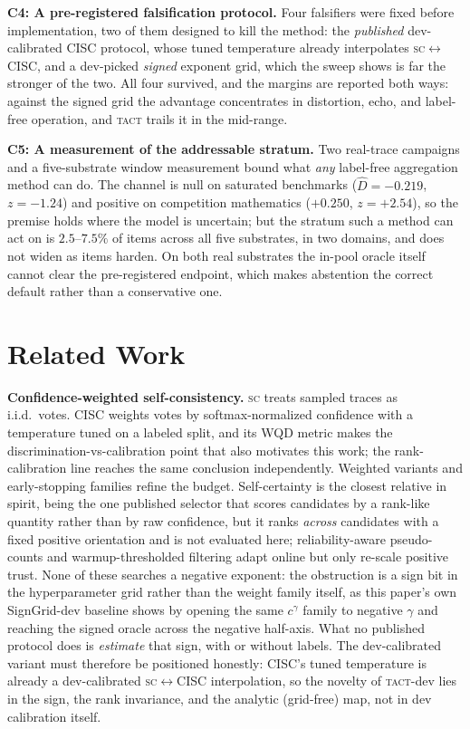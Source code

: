 \documentclass[twoside,11pt]{article}
\newcommand{\Dhat}{\widehat{D}}
\newcommand{\SC}{\textsc{sc}}
\newcommand{\TACT}{\textsc{tact}}
\begin{document}
\textbf{C4: A pre-registered falsification protocol.} Four falsifiers were
fixed before implementation, two of them designed to kill the method: the
\emph{published} dev-calibrated CISC protocol, whose tuned temperature already
interpolates \SC$\leftrightarrow$CISC, and a dev-picked \emph{signed} exponent
grid, which the sweep shows is far the stronger of the two. All four survived,
and the margins are reported both ways: against the signed grid the advantage
concentrates in distortion, echo, and label-free operation, and \TACT{} trails
it in the mid-range.

\textbf{C5: A measurement of the addressable stratum.} Two real-trace
campaigns and a five-substrate window measurement bound what \emph{any}
label-free aggregation method can do. The channel is null on saturated
benchmarks ($\Dhat=-0.219$, $z=-1.24$) and positive on competition
mathematics ($+0.250$, $z=+2.54$), so the premise holds where the model is
uncertain; but the stratum such a method can act on is $2.5$--$7.5\%$ of items
across all five substrates, in two domains, and does not widen as items
harden.
On both real substrates the in-pool oracle itself cannot clear the
pre-registered endpoint, which makes abstention the correct default rather
than a conservative one.

\section{Related Work}\label{sec:related}

\textbf{Confidence-weighted self-consistency.} \SC{} \citep{wang2023selfconsistency} treats sampled traces as i.i.d.\ votes. CISC \citep{taubenfeld2025cisc} weights votes by softmax-normalized confidence with a temperature tuned on a labeled split, and its WQD metric makes the discrimination-vs-calibration point that also motivates this work; the rank-calibration line \citep{huang2024rankcalibration} reaches the same conclusion independently. Weighted variants \citep{li2023diverse} and early-stopping families
\citep{aggarwal2023adaptive,li2024escape} refine the budget. Self-certainty
\citep{borda2025} is the closest relative in spirit, being the one published
selector that scores candidates by a rank-like quantity rather than by raw
confidence, but it ranks \emph{across} candidates with a fixed positive
orientation and is not evaluated here; reliability-aware pseudo-counts \citep{reasc2026} and warmup-thresholded filtering \citep{deepconf2025} adapt online but only re-scale positive trust. None of these searches a negative exponent: the obstruction is a sign bit in
the hyperparameter grid rather than the weight family itself, as this paper's
own SignGrid-dev baseline shows by opening the same $c^{\gamma}$ family to
negative $\gamma$ and reaching the signed oracle across the negative half-axis.
What no published protocol does is \emph{estimate} that sign, with or without
labels. The dev-calibrated variant must therefore be positioned honestly: CISC's tuned temperature is already a dev-calibrated \SC$\leftrightarrow$CISC interpolation, so the novelty of \TACT-dev lies in the sign, the rank invariance, and the analytic (grid-free) map, not in dev calibration itself.
\end{document}
